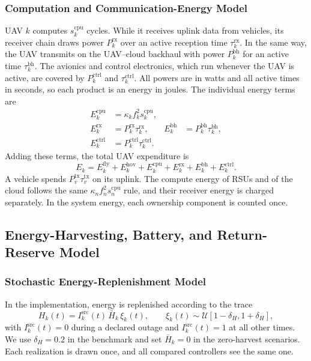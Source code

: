 \subsubsection{Computation and Communication-Energy Model}
UAV $k$ computes $s_k^{\mathrm{cpu}}$ cycles. While it receives uplink data
from vehicles, its receiver chain draws power $P_k^{\mathrm{rx}}$ over an
active reception time $\tau_k^{\mathrm{rx}}$. In the same way, the UAV
transmits on the UAV--cloud backhaul with power $P_k^{\mathrm{bh}}$ for an
active time $\tau_k^{\mathrm{bh}}$. The avionics and control electronics,
which run whenever the UAV is active, are covered by $P_k^{\mathrm{ctrl}}$
and $\tau_k^{\mathrm{ctrl}}$. All powers are in watts and all active times in
seconds, so each product is an energy in joules. The individual energy terms
are
\begin{equation}
\begin{aligned}
E_k^{\mathrm{cpu}}&=\kappa_k f_k^2s_k^{\mathrm{cpu}},\\
E_k^{\mathrm{rx}}&=P_k^{\mathrm{rx}}\tau_k^{\mathrm{rx}},&
E_k^{\mathrm{bh}}&=P_k^{\mathrm{bh}}\tau_k^{\mathrm{bh}},\\
E_k^{\mathrm{ctrl}}&=P_k^{\mathrm{ctrl}}\tau_k^{\mathrm{ctrl}}.&&
\end{aligned}
\label{eq:energy_components}
\end{equation}
Adding these terms, the total UAV expenditure is
\begin{equation}
E_k=E_k^{\mathrm{fly}}+E_k^{\mathrm{hov}}+E_k^{\mathrm{cpu}}
+E_k^{\mathrm{rx}}+E_k^{\mathrm{bh}}+E_k^{\mathrm{ctrl}}.
\label{eq:uav_energy}
\end{equation}
A vehicle spends $P_v^{\mathrm{tx}}\tau_v^{\mathrm{tx}}$ on its uplink. The
compute energy of RSUs and of the cloud follows the same
$\kappa_nf_n^2s_n^{\mathrm{cpu}}$ rule, and their receiver energy is charged
separately. In the system energy, each ownership component is counted once.

\subsection{Energy-Harvesting, Battery, and Return-Reserve Model}
\subsubsection{Stochastic Energy-Replenishment Model}
In the implementation, energy is replenished according to the trace
\begin{equation}
H_k(t)=I_k^{\mathrm{src}}(t)\,\bar H_k\,\xi_k(t),\qquad
\xi_k(t)\sim\mathcal U[1-\delta_H,1+\delta_H],
\label{eq:stochastic_harvest}
\end{equation}
with $I_k^{\mathrm{src}}(t)=0$ during a declared outage and
$I_k^{\mathrm{src}}(t)=1$ at all other times. We use $\delta_H=0.2$ in the benchmark and set
$\bar H_k=0$ in the zero-harvest scenarios. Each realization is drawn once,
and all compared controllers see the same one.

